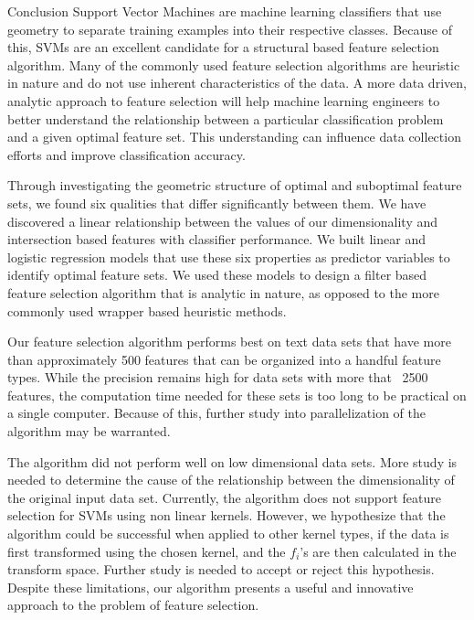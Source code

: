 \documentclass{llncs}
\begin{document}
\begin{section}{Conclusion}
Support Vector Machines are machine learning classifiers that use geometry to separate training examples into their respective classes. Because of this, SVMs are an excellent candidate for a structural based feature selection algorithm. Many of the commonly used feature selection algorithms are heuristic in nature and do not use inherent characteristics of the data. A more data driven, analytic approach to feature selection will help machine learning engineers to better understand the relationship between a particular classification problem and a given optimal feature set. This understanding can influence data collection efforts and improve classification accuracy.


Through investigating the geometric structure of optimal and suboptimal feature sets, we found six qualities that differ significantly between them. We have discovered a linear relationship between the values of our dimensionality and intersection based features with classifier performance. We built linear and logistic regression models that use these six properties as predictor variables to identify optimal feature sets. We used these models to design a filter based feature selection algorithm that is analytic in nature, as opposed to the more commonly used wrapper based heuristic methods. 


Our feature selection algorithm performs best on text data sets that have more than approximately 500 features that can be organized into a handful feature types. While the precision remains high for data sets with more that ~2500 features, the computation time needed for these sets is too long to be practical on a single computer. Because of this, further study into parallelization of the algorithm may be warranted.


The algorithm did not perform well on low dimensional data sets. More study is needed to determine the cause of the relationship between the dimensionality of the original input data set. Currently, the algorithm does not support feature selection for SVMs using non linear kernels. However, we hypothesize that the algorithm could be successful when applied to other kernel types, if the data is first transformed using the chosen kernel, and the $f_i$'s are then calculated in the transform space. Further study is needed to accept or reject this hypothesis. Despite these limitations, our algorithm presents a useful and innovative approach to the problem of feature selection.
\end{section}



\end{document}
